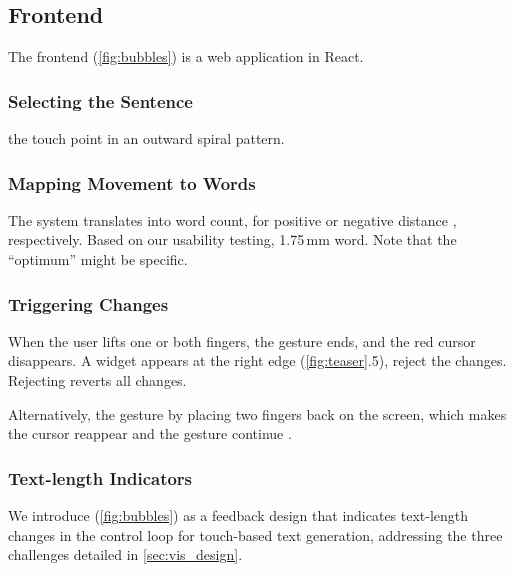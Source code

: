 \subsection{Frontend}
The frontend (\cref{fig:bubbles}) is a web application in React.

\subsubsection{Selecting the Sentence}
 the touch point in an outward spiral pattern.

\subsubsection{Mapping Movement to Words}
\label{sec:dist_word_mapping}
The system translates  into  word count,  for positive or negative distance , respectively. 
Based on our usability testing,  1.75\,mm  word. Note that the ``optimum'' might be specific. %

\subsubsection{Triggering Changes}
When the user lifts one or both fingers, the gesture ends, and the red cursor disappears.
A widget appears at the right  edge (\cref{fig:teaser}.5),  reject the changes. 
Rejecting reverts all changes. 

Alternatively,  the gesture by placing two fingers back on the screen, which makes the cursor reappear and the gesture continue . 

\subsubsection{Text-length Indicators}\label{sec:impl_text_length_ind}
We introduce \textit{\visbubble} (\cref{fig:bubbles}) as a feedback design that indicates text-length changes in the control loop for touch-based text generation, addressing the three challenges detailed in \cref{sec:vis_design}.

